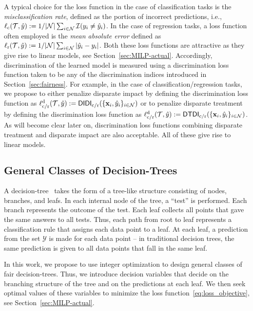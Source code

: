 \documentclass[letterpaper]{article} %
\theoremstyle{definition}
\newcommand{\1}{\ensuremath{{\rm e}}} %
\begin{document}
A typical choice for the loss function in the case of classification tasks is the \emph{misclassification rate}, defined as the portion of incorrect predictions, i.e., $\ell_{\rm c}(\mathcal T, \hat y) := 1/| \mathcal N | \sum_{i \in \mathcal N} \mathcal I ( y_i \neq \hat y_i )$. In the case of regression tasks, a loss function often employed is the \emph{mean absolute error} defined as $\ell_{\rm r}({\mathcal T}, \hat y) := 1/| \mathcal N | \sum_{i \in \mathcal N} | \hat y_i - y_i |$. Both these loss functions are attractive as they give rise to linear models, see Section~\ref{sec:MILP-actual}. Accordingly, discrimination of the learned model is measured using a discrimination loss function taken to be any of the discrimination indices introduced in Section~\ref{sec:fairness}. For example, in the case of classification/regression tasks, we propose to either penalize disparate impact by defining the discrimination loss function as $\ell^{\rm d}_{\rm c/\rm r}({\mathcal T},\hat y):= \mathsf{DIDI}_{\rm c/\rm r}(\{ {\bf x}_i, \hat y_i \}_{i\in \mathcal N})$ or to penalize disparate treatment by defining the discrimination loss function as $\ell^{\rm d}_{\rm c/\rm r}({\mathcal T},\hat y):= \mathsf{DTDI}_{\rm c/\rm r}(\{ {\bf x}_i, \hat y_i \}_{i\in \mathcal N})$. As will become clear later on, discrimination loss functions combining disparate treatment and disparate impact are also acceptable. All of these give rise to linear models.

\subsection{General Classes of Decision-Trees}
\label{sec:decision-trees-general}

A decision-tree~\cite{breiman1984classification} takes the form of a tree-like structure consisting of nodes, branches, and leafs. In each internal node of the tree, a ``test'' is performed. Each branch represents the outcome of the test. Each leaf collects all points that gave the same answers to all tests. Thus, each path from root to leaf represents a classification rule that assigns each data point to a leaf. At each leaf, a prediction from the set $\mathcal Y$ is made for each data point -- in traditional decision trees, the same prediction is given to all data points that fall in the same leaf.

In this work, we propose to use integer optimization to design general classes of fair decision-trees. Thus, we introduce decision variables that decide on the branching structure of the tree and on the predictions at each leaf. We then seek optimal values of these variables to minimize the loss function~\eqref{eq:loss_objective}, see Section~\ref{sec:MILP-actual}. 
\end{document}
